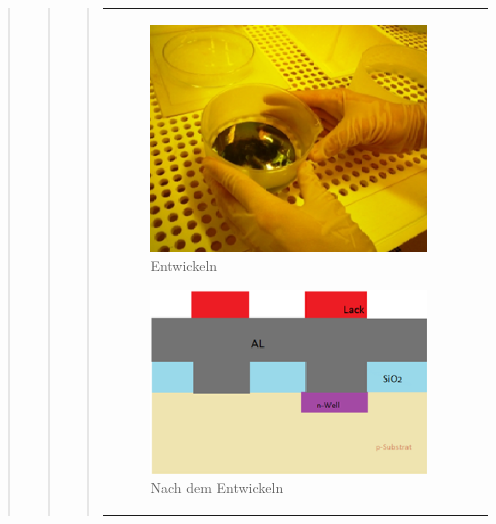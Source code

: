 \begin{quote}
\begin{quote}
\begin{quote}
			\vspace{2em}
    
    		\begin{center}
                \begin{tabular}{ll}

                \hspace{-14em}
                    \begin{minipage}{0.6\textwidth}
                        \begin{figure}[H]
                        \hspace{2em}
                            \includegraphics[scale=1.0, trim = 0cm 0cm 0cm
                            0cm, clip]{./HerstellungBilder/Entwickeln.png}
                            \caption{Entwickeln}
                           \label{fig:entw}
                        \end{figure}

                    \end{minipage}
                    \begin{minipage}{0.6\textwidth} 

                        \begin{figure}[H]
                        \hspace{0em}
                            \includegraphics[scale=0.9, trim = 0cm 0cm 0cm
                            0cm, clip]
                            {./HerstellungBilder/NachdemEntwickeln.png}
                            \caption{Nach dem Entwickeln}
                           \label{fig:nachentw}
                        \end{figure}
                    \vspace{-1.5em}


\end{minipage}
\end{tabular}
\end{center}
\end{quote}
\end{quote}
\end{quote}

